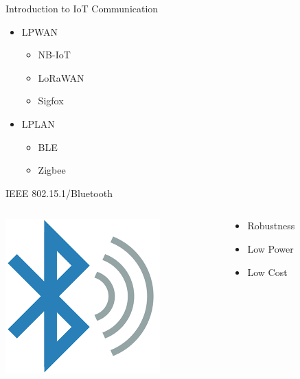 \documentclass[serif,Blue]{beamer}
\begin{document}
\begin{frame}{Introduction to IoT Communication}
	\begin{itemize}
		\item LPWAN
			\begin{itemize}
				\item NB-IoT
				\item LoRaWAN
				\item Sigfox
			\end{itemize}
		\item LPLAN
			\begin{itemize}
				\item BLE
				\item Zigbee
			\end{itemize}
	\end{itemize}
\end{frame}


\begin{frame}{IEEE 802.15.1/Bluetooth}
	\begin{columns}
		\begin{column}{0.5\textwidth}
			\begin{center}
				\includegraphics[scale=0.4]{img/ble.png}
			\end{center}
		\end{column}
		\begin{column}{0.5\textwidth}
			\begin{itemize}
				\item Robustness
				\item Low Power
				\item Low Cost
			\end{itemize}
		\end{column}
	\end{columns}
\end{frame}
\end{document}
